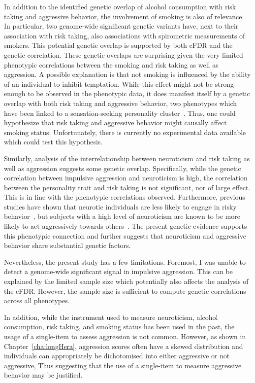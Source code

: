 In addition to the identified genetic overlap of alcohol consumption with risk taking and aggressive behavior, the involvement of smoking is also of relevance.
In particular, two genome-wide significant genetic variants have, next to their association with risk taking, also associations with spirometric measurements of smokers.
This potential genetic overlap is supported by both cFDR and the genetic correlation.
These genetic overlaps are surprising given the very limited phenotypic correlations between the smoking and risk taking as well as aggression.
A possible explanation is that not smoking is influenced by the ability of an individual to  inhibit temptation.
While this effect might not be strong enough to be observed in the phenotypic data, it does manifest itself by a genetic overlap with both risk taking and aggressive behavior,
two phenotypes which have been linked to a sensation-seeking personality cluster~\cite{Zuckerman2000}.
Thus, one could hypothesize that risk taking and aggressive behavior might causally affect smoking status.
Unfortunately, there is currently no experimental data available which could test this hypothesis.

Similarly, analysis of the interrelationship between neuroticism and risk taking as well as aggression suggests some genetic overlap.
Specifically, while the genetic correlation between impulsive aggression and neuroticism is high, the correlation between the personality trait and risk taking is not significant, nor of large effect.
This is in line with the phenotypic correlations observed.
Furthermore, previous studies have shown that neurotic individuals are less likely to engage in risky behavior~\cite{Lauriola2001,InstituteofMedicine2011,Paulus2003}, but subjects with a high level of neuroticism are known to be more likely to act aggressively towards others~\cite{Meesters2007}.
The present genetic evidence supports this phenotypic connection and further suggests that neuroticism and aggressive behavior share substantial genetic factors.

Nevertheless, the  present study has a few limitations.
Foremost, I was unable to detect a genome-wide significant signal in impulsive aggression.
This can be explained by the limited sample size which potentially also affects the analysis of the cFDR\@.
However, the sample size is sufficient to compute genetic correlations across all  phenotypes.

In addition, while the instrument used to measure  neuroticism, alcohol consumption, risk taking, and smoking status has been used in the past, the usage of a single-item to assess aggression is not common.
However, as shown in Chapter~\ref{cha:longHera},  aggression scores often have a skewed distribution and individuals can appropriately be dichotomised into either aggressive or not aggressive,
Thus suggesting that the use of a single-item to measure aggressive behavior may be justified.

